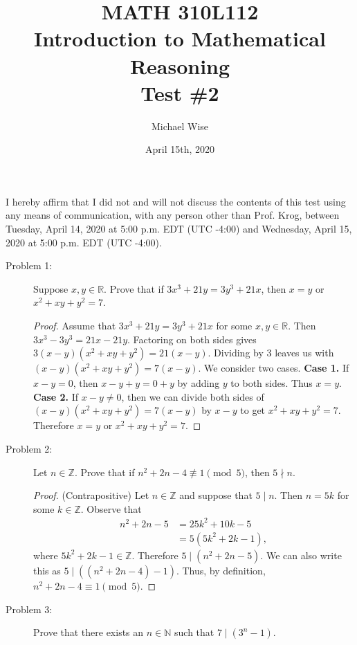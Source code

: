 \documentclass[12pt]{article}
\title{MATH 310L112\\
       Introduction to Mathematical Reasoning\\
       Test \#2}
\author{Michael Wise}
\date{April 15th, 2020}
\begin{document}
\maketitle
I hereby affirm that I did not and will not discuss the contents of this test using any means of communication, with any person other than Prof. Krog, between Tuesday, April 14, 2020 at 5:00 p.m. EDT (UTC -4:00) and Wednesday, April 15, 2020 at 5:00 p.m. EDT (UTC -4:00).

\begin{description}
\item[Problem 1:] Suppose $x,y \in \mathbb{R}$. Prove that if $3x^3 + 21y = 3y^3 + 21x$, then $x = y$ or $x^2 + xy +y^2 = 7$.
\begin{spacing}{2}
\begin{proof}
Assume that $3x^3 + 21y = 3y^3 + 21x$ for some $x,y \in \mathbb{R}$. Then $3x^3 -3y^3 = 21x - 21y$. Factoring on both sides gives $3 (x-y)(x^2 + xy+ y^2) = 21(x-y)$. Dividing by $3$ leaves us with $(x-y)(x^2 + xy+ y^2) = 7(x-y)$. We consider two cases.
\newline
\textbf{Case 1.} If $x-y=0$, then $x-y+y=0+y$ by adding $y$ to both sides. Thus $x=y$.
\newline
\textbf{Case 2.} If $x-y \neq 0$, then we can divide both sides of $(x-y)(x^2 + xy+ y^2) = 7(x-y)$ by $x-y$ to get $x^2 + xy +y^2 = 7$.
\newline
Therefore $x=y$ or $x^2 + xy +y^2 = 7$.
\end{proof}
\end{spacing}
\item[Problem 2:] Let $n \in \mathbb{Z}.$ Prove that if $n^2 + 2n - 4 \not \equiv 1\pmod{5}$, then $5 \nmid n$.
\begin{spacing}{2}
\begin{proof}
(Contrapositive) Let $n \in \mathbb{Z}$ and suppose that $5 \mid n$. Then $n = 5k$ for some $k \in \mathbb{Z}$. Observe that
\begin{align*}
n^2 + 2n -5 &= 25k^2 + 10k - 5 \\
&= 5(5k^2 + 2k - 1),
\end{align*}
where $5k^2 + 2k - 1 \in \mathbb{Z}$. Therefore $5 \mid (n^2 + 2n - 5)$. We can also write this as $5 \mid ((n^2 + 2n - 4) - 1)$. Thus, by definition, $n^2 + 2n - 4 \equiv 1\pmod{5}$.
\end{proof}
\end{spacing} 

\item[Problem 3:] Prove that there exists an $n \in \mathbb{N}$ such that $7 \mid (3^n - 1)$.


\end{description}
\end{document}
